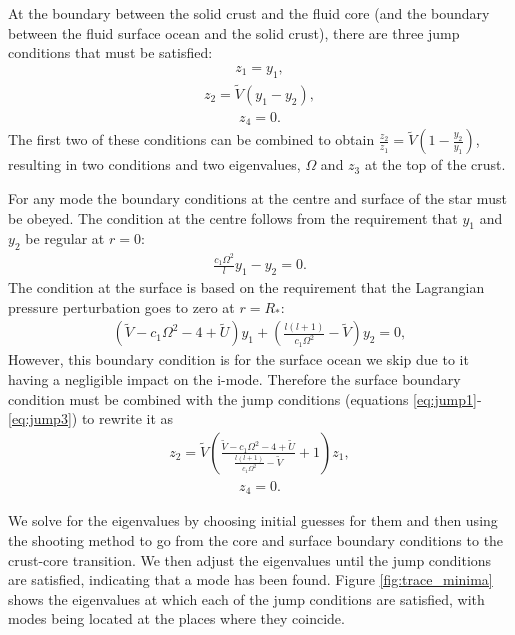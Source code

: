 \documentclass[fleqn,usenatbib]{mnras}
\begin{document}
\hspace{\parindent}At the boundary between the solid crust and the fluid core (and the boundary between the fluid surface ocean and the solid crust), there are three jump conditions that must be satisfied:
\begin{align}
z_1=y_1,
\label{eq:jump1}
\end{align}
\begin{align}
z_2=\tilde{V}(y_1-y_2),
\label{eq:jump2}
\end{align}
\begin{align}
z_4=0.
\label{eq:jump3}
\end{align}
\noindent The first two of these conditions can be combined to obtain $\frac{z_2}{z_1}=\tilde{V}\left(1-\frac{y_2}{y_1}\right)$, resulting in two conditions and two eigenvalues, $\Omega$ and $z_3$ at the top of the crust.  %



\hspace{\parindent}For any mode the boundary conditions at the centre and surface of the star must be obeyed. The condition at the centre follows from the requirement that $y_1$ and $y_2$ be regular at $r=0$:
\begin{align}
\frac{c_1\Omega^2}{l}y_1-y_2=0.
\label{eq:core_condition}
\end{align}
\noindent The condition at the surface is based on the requirement that the Lagrangian pressure perturbation goes to zero at $r=R_*$:
\begin{align}
\left(\tilde{V}-c_1\Omega^2-4+\tilde{U}\right)y_1+\left(\frac{l(l+1)}{c_1\Omega^2}-\tilde{V}\right)y_2=0,
\label{eq:surface_condition}
\end{align}
\noindent However, this boundary condition is for the surface ocean we skip due to it having a negligible impact on the i-mode. Therefore the surface boundary condition must be combined with the jump conditions (equations \ref{eq:jump1}-\ref{eq:jump3}) to rewrite it as
\begin{align}
z_2=\tilde{V}\left(\frac{\tilde{V}-c_1\Omega^2-4+\tilde{U}}{\frac{l(l+1)}{c_1\Omega^2}-\tilde{V}}+1\right)z_1,
\label{eq:surface_boundary_modified_1}
\end{align}
\begin{align}
z_4=0.
\label{eq:surface_boundary_modified_2}
\end{align}



\hspace{\parindent}We solve for the eigenvalues by choosing initial guesses for them and then using the shooting method to go from the core and surface boundary conditions to the crust-core transition. We then adjust the eigenvalues until the jump conditions are satisfied, indicating that a mode has been found. Figure \ref{fig:trace_minima} shows the eigenvalues at which each of the jump conditions are satisfied, with modes being located at the places where they coincide.
\end{document}
